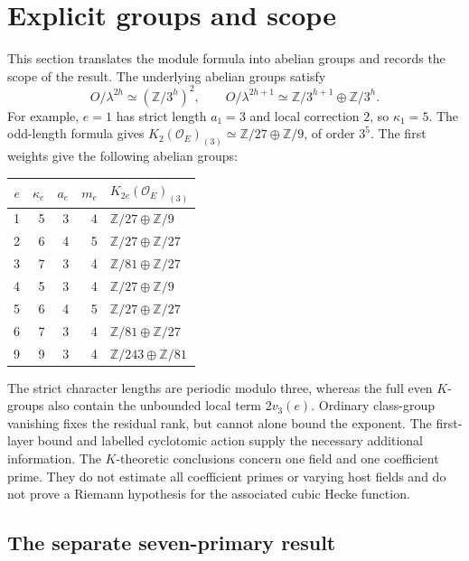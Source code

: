 \documentclass[11pt]{article}
\theoremstyle{remark}\newtheorem{remark}[theorem]{Remark}
\newcommand{\Z}{\mathbb Z}\newcommand{\Q}{\mathbb Q}\newcommand{\F}{\mathbb F}
\newcommand{\Oa}{\mathcal O}\newcommand{\Cl}{\operatorname{Cl}}
\begin{document}
\section{Explicit groups and scope}
This section translates the module formula into abelian groups and records the scope of the result.
The underlying abelian groups satisfy
\[
 O/\lambda^{2h}\simeq(\Z/3^h)^2,\qquad
 O/\lambda^{2h+1}\simeq\Z/3^{h+1}\oplus\Z/3^h.
\]
For example, $e=1$ has strict length $a_1=3$ and local correction $2$, so $\kappa_1=5$.
The odd-length formula gives $K_2(\Oa_E)_{(3)}\simeq\Z/27\oplus\Z/9$, of order $3^5$.
The first weights give the following abelian groups:
\begin{center}\begin{tabular}{@{}rrrrl@{}}\toprule
$e$&$\kappa_e$&$a_e$&$m_e$&$K_{2e}(\Oa_E)_{(3)}$\\\midrule
1&5&3&4&$\Z/27\oplus\Z/9$\\
2&6&4&5&$\Z/27\oplus\Z/27$\\
3&7&3&4&$\Z/81\oplus\Z/27$\\
4&5&3&4&$\Z/27\oplus\Z/9$\\
5&6&4&5&$\Z/27\oplus\Z/27$\\
6&7&3&4&$\Z/81\oplus\Z/27$\\
9&9&3&4&$\Z/243\oplus\Z/81$\\\bottomrule
\end{tabular}\end{center}
The strict character lengths are periodic modulo three, whereas the full even $K$-groups also contain the unbounded local term $2v_3(e)$.
Ordinary class-group vanishing fixes the residual rank, but cannot alone bound the exponent.
The first-layer bound and labelled cyclotomic action supply the necessary additional information.
The $K$-theoretic conclusions concern one field and one coefficient prime. They do not estimate all coefficient primes or varying host fields and do not prove a Riemann hypothesis for the associated cubic Hecke function.

\subsection{The separate seven-primary result}
\end{document}
